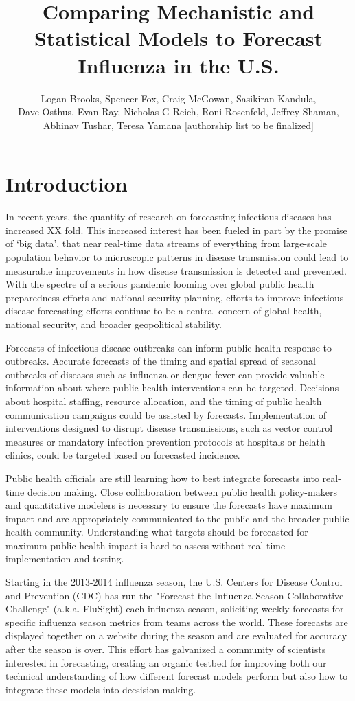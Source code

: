 \documentclass{article}\usepackage[]{graphicx}\usepackage[]{color}
\title{Comparing Mechanistic and Statistical Models to Forecast Influenza in the U.S.}
\author{Logan Brooks, Spencer Fox, Craig McGowan, Sasikiran Kandula, \\ Dave Osthus, Evan Ray, Nicholas G Reich, Roni Rosenfeld, Jeffrey Shaman, \\Abhinav Tushar, Teresa Yamana [authorship list to be finalized]}
\begin{document}
\maketitle

\tableofcontents




\section{Introduction}

In recent years, the quantity of research on forecasting infectious diseases has increased XX fold. 
This increased interest has been fueled in part by the promise of `big data', that near real-time data streams of everything from large-scale population behavior to microscopic patterns in disease transmission could lead to measurable improvements in how disease transmission is detected and prevented. 
With the spectre of a serious pandemic looming over global public health preparedness efforts and national security planning, efforts to improve infectious disease forecasting efforts continue to be a central concern of global health, national security, and broader geopolitical stability.

Forecasts of infectious disease outbreaks can inform public health response to outbreaks. 
Accurate forecasts of the timing and spatial spread of seasonal outbreaks of diseases such as influenza or dengue fever can provide valuable information about where public health interventions can be targeted.
Decisions about hospital staffing, resource allocation, and the timing of public health communication campaigns could be assisted by forecasts. 
Implementation of interventions designed to disrupt disease transmissions, such as vector control measures or mandatory infection prevention protocols at hospitals or helath clinics, could be targeted based on forecasted incidence.

Public health officials are still learning how to best integrate forecasts into real-time decision making.
Close collaboration between public health policy-makers and quantitative modelers is necessary to ensure the forecasts have maximum impact and are appropriately communicated to the public and the broader public health community. 
Understanding what targets should be forecasted for maximum public health impact is hard to assess without real-time implementation and testing.


Starting in the 2013-2014 influenza season, the U.S. Centers for Disease Control and Prevention (CDC) has run the "Forecast the Influenza Season Collaborative Challenge" (a.k.a. FluSight) each influenza season, soliciting weekly forecasts for specific influenza season metrics from teams across the world.
These forecasts are displayed together on a website during the season and are evaluated for accuracy after the season is over.\cite{PhiResearchLab} 
This effort has galvanized a community of scientists interested in forecasting, creating an organic testbed for improving both our technical understanding of how different forecast models perform but also how to integrate these models into decsision-making.
\end{document}
